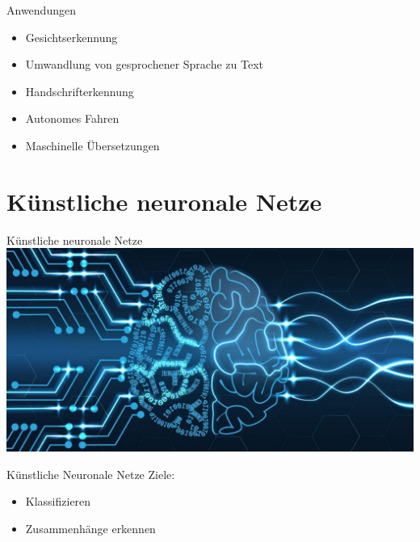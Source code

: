 \documentclass[18pt]{beamer}
\begin{document}
\begin{frame}{Anwendungen}
\begin{itemize}
\item{Gesichtserkennung}
\item{Umwandlung von gesprochener Sprache zu Text}
\item{Handschrifterkennung}
\item{Autonomes Fahren}
\item{Maschinelle Übersetzungen}
\end{itemize}
\end{frame}

\section{Künstliche neuronale Netze}

\begin{frame}{Künstliche neuronale Netze}
\includegraphics[scale=0.25]{images/BrainNN.jpg}
\cite{BrainNN}
\end{frame}

\begin{frame}{Künstliche Neuronale Netze}
Ziele:
\begin{itemize}
\item{Klassifizieren}
\item{Zusammenhänge erkennen}
\end{itemize}
\end{frame}

\end{document}
